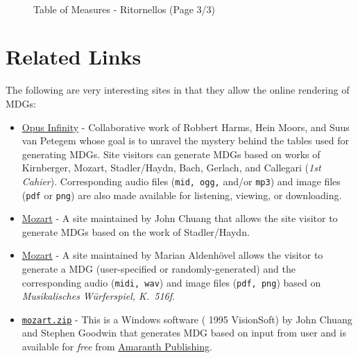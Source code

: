 \documentclass[a4paper,x11names,svgnames,10pt]{article}
\begin{document}
{\newpage
${}_{}$\\
\vspace{0.10in}
\begin{figure}[H]
	\centering
	\def\svgwidth{0.975\columnwidth}
	
	\caption{Table of Measures - Ritornellos (Page 3/3)}
	\label{fig:meas16}
\end{figure}


\section{Related Links}
The following are very interesting sites in that they allow the online rendering of MDGs:
\begin{itemize}
	\item \href{https://opus-infinity.org}{Opus Infinity} - Collaborative work of Robbert Harms, Hein Moors, and Suus van Petegem whose goal is to unravel the mystery behind the tables used for generating MDGs.  Site visitors can generate MDGs based on works of Kirnberger, Mozart, Stadler/Haydn, Bach, Gerlach, and Callegari ({\it 1st Cahier}).  Corresponding audio files ({\tt mid, ogg,} and/or {\tt mp3}) and image files ({\tt pdf} or {\tt png}) are also made available for listening, viewing, or downloading.
	
	\item  \href{http://sunsite.univie.ac.at/Mozart/dice/}{Mozart} - A site maintained by John Chuang that allows the site visitor to generate MDGs based on the work of Stadler/Haydn.
	
	\item  \href{https://marian-aldenhoevel.de/mozart/}{Mozart} - A site maintained by Marian Aldenh\"{o}vel allows the visitor to generate a MDG (user-specified or randomly-generated) and the corresponding audio ({\tt midi, wav}) and image files ({\tt pdf, png}) based on {\em Musikalisches W\"{u}rferspiel, K.\ 516f}.
	
	\item \href{https://www.amaranthpublishing.com/mozart.zip}{\tt mozart.zip} -  This is a Windows software ({\small\textcopyright} 1995 VisionSoft) by John Chuang and Stephen Goodwin that generates MDG based on input from user and is available for {\it free} from  \href{http://www.amaranthpublishing.com/MozartDiceGame.htm}{Amaranth Publishing}.  
	

\end{itemize}}
\end{document}
